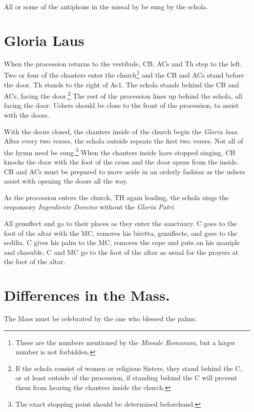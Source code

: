 {	\rubric All or some of the antiphons in the missal by be sung by the
	schola.

	\section{Gloria Laus}

	\rubric When the procession returns to the vestibule, CB, ACs and Th step
	to the left. Two or four of the chanters enter the church\footnote{These
		are the numbers mentioned by the \textit{Missale Romanum}, but a larger
	number is not forbidden.} and the CB and ACs stand before the door. Th stands
	to the right of Ac1. The schola stands behind the CB and ACs, facing the
	door.\footnote{If the schola consist of women or religious Sisters, they stand
		behind the C, or at least outside of the procession, if standing behind the
	C will prevent them from hearing the chanters inside the church.} The rest of
	the procession lines up behind the schola, all facing the door. Ushers should
	be close to the front of the procession, to assist with the doors.

	\rubric With the doors closed, the chanters inside of the church begin the
	\textit{Gloria laus}. After every two verses, the schola outside repeats
	the first two verses. Not all of the hymn need be sung.\footnote{The exact
	stopping point should be determined beforehand.} When the chanters inside
	have stopped singing, CB knocks the door with the foot of the cross and the
	door opens from the inside. CB and ACs must be prepared to move aside in an
	orderly fashion as the ushers assist with opening the doors all the way.

	\rubric As the procession enters the church, TH again leading, the schola
	sings the responsory \textit{Ingrediente Domino} without the \textit{Gloria
	Patri}.

	\rubric All genuflect and go to their places as they enter the sanctuary. C
	goes to the foot of the altar with the MC, removes his biretta, genuflects,
	and goes to the sedilia. C gives his palm to the MC, removes the cope and
	puts on his maniple and chasuble. C and MC go to the foot of the altar as
	usual for the prayers at the foot of the altar.

	\section{Differences in the Mass.}

	\rubric The Mass must be celebrated by the one who blessed the palms.

}
